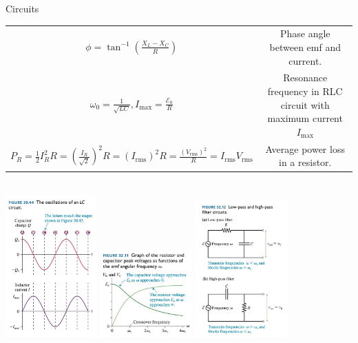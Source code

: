 \documentclass{article}
\begin{document}
\begin{center}
\begin{section}{Circuits}
\begin{tabular}{|c|c|}
		 $\phi = \tan^{-1} \left( \frac{X_L - X_C}{R} \right)$                          & Phase angle between emf and current.              \\

		 $\omega_0 = \frac{1}{\sqrt{LC}}, I_\text{max}
		 = \frac{\mathcal E_0}{R}$                                                      & \makecell{Resonance frequency in RLC circuit      \\
		 with maximum current $I_\text{max}$ }                                                                                              \\

		 $P_R = \frac 1 2 I_R^2 R = \left( \frac{I_R}{\sqrt 2} \right)^2 R
		 = (I_\text{rms})^2 R = \frac{(V_\text{rms})^2}{R} = I_\text{rms} V_\text{rms}$ & Average power loss in a resistor.                 \\


		 \hline
	 \end{tabular}
	 \\
	 \includegraphics[width=100pt]{final_cheet_sheet_resources/knhwzgniatxeirlvrdqvgqrgyvbpycxs.jpg}
	 \includegraphics[width=100pt]{final_cheet_sheet_resources/mqbfppsrjecahghjqzghukiiyymfwtox.jpg}
	 \includegraphics[width=100pt]{final_cheet_sheet_resources/bbkpguezzmblocutfwvwjptztmtqsieb.jpg}
	\end{section}
\end{center}
\end{document}
